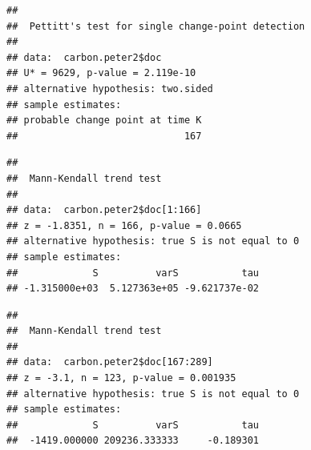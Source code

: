 \documentclass[12pt,]{article}
\newenvironment{Shaded}{\begin{snugshade}}{\end{snugshade}}
\newcommand{\KeywordTok}[1]{\textcolor[rgb]{0.13,0.29,0.53}{\textbf{#1}}}
\newcommand{\DecValTok}[1]{\textcolor[rgb]{0.00,0.00,0.81}{#1}}
\newcommand{\CommentTok}[1]{\textcolor[rgb]{0.56,0.35,0.01}{\textit{#1}}}
\newcommand{\OperatorTok}[1]{\textcolor[rgb]{0.81,0.36,0.00}{\textbf{#1}}}
\newcommand{\NormalTok}[1]{#1}
\begin{document}
\begin{verbatim}
## 
##  Pettitt's test for single change-point detection
## 
## data:  carbon.peter2$doc
## U* = 9629, p-value = 2.119e-10
## alternative hypothesis: two.sided
## sample estimates:
## probable change point at time K 
##                             167
\end{verbatim}

\begin{Shaded}
\end{Shaded}

\begin{verbatim}
## 
##  Mann-Kendall trend test
## 
## data:  carbon.peter2$doc[1:166]
## z = -1.8351, n = 166, p-value = 0.0665
## alternative hypothesis: true S is not equal to 0
## sample estimates:
##             S          varS           tau 
## -1.315000e+03  5.127363e+05 -9.621737e-02
\end{verbatim}

\begin{Shaded}
\end{Shaded}

\begin{verbatim}
## 
##  Mann-Kendall trend test
## 
## data:  carbon.peter2$doc[167:289]
## z = -3.1, n = 123, p-value = 0.001935
## alternative hypothesis: true S is not equal to 0
## sample estimates:
##             S          varS           tau 
##  -1419.000000 209236.333333     -0.189301
\end{verbatim}

\begin{Shaded}
\end{Shaded}
\end{document}
